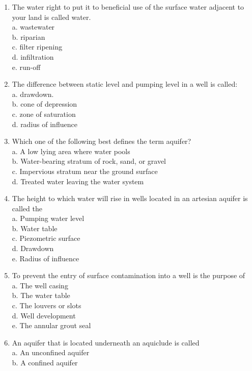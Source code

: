 \begin{enumerate}[1.]
\item The water right to put it to beneficial use of the surface water adjacent to your land is called water.\\
a. wastewater\\
b. riparian\\
c. filter ripening\\
d. infiltration\\
e. run-off\\
\item The difference between static level and pumping level in a well is called:\\
a. drawdown.\\
b. cone of depression\\
c. zone of saturation\\
d. radius of influence\\
\item Which one of the following best defines the term aquifer?\\
 a. A low lying area where water pools\\
 b. Water-bearing stratum of rock, sand, or gravel\\
 c. Impervious stratum near the ground surface\\
 d. Treated water leaving the water system\\
 \item The height to which water will rise in wells located in an artesian aquifer is called the\\
 a. Pumping water level\\
 b. Water table\\
 c. Piezometric surface\\
 d. Drawdown\\
 e. Radius of influence\\
 \item To prevent the entry of surface contamination into a well is the purpose of\\
 a. The well casing\\
 b. The water table\\
 c. The louvers or slots\\
 d. Well development\\
 e. The annular grout seal\\
 \item An aquifer that is located underneath an aquiclude is called\\
 a. An unconfined aquifer\\
 b. A confined aquifer\\

\end{enumerate}
